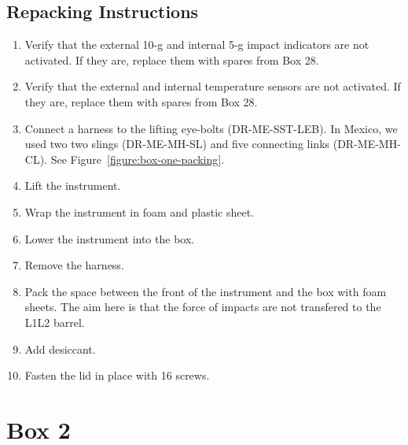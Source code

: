 \documentclass{article}
\begin{document}
\subsection{Repacking Instructions}

\begin{enumerate}
\item Verify that the external 10-g and internal 5-g impact indicators are not activated. If they are, replace them with spares from Box 28.
\item Verify that the external and internal temperature sensors are not activated. If they are, replace them with spares from Box 28.
\item Connect a harness to the lifting eye-bolts  (DR-ME-SST-LEB). In Mexico, we used two two slings (DR-ME-MH-SL) and 
five connecting links (DR-ME-MH-CL). See Figure~\ref{figure:box-one-packing}.
\item Lift the instrument.
\item Wrap the instrument in foam and plastic sheet.
\item Lower the instrument into the box.
\item Remove the harness.
\item Pack the space between the front of the instrument and the box with foam sheets. The aim here is that the force of impacts are not transfered to the L1L2 barrel.
\item Add desiccant.
\item Fasten the lid in place with 16 screws.
\end{enumerate}


\clearpage
\section{Box 2}
\end{document}
